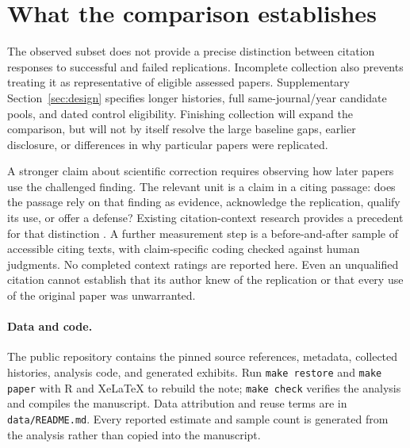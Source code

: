 \documentclass[11pt,letterpaper]{article}
\begin{document}
\section{What the comparison establishes}
The observed subset does not provide a precise distinction between citation responses to successful and failed replications. Incomplete collection also prevents treating it as representative of eligible assessed papers. Supplementary Section~\ref{sec:design} specifies longer histories, full same-journal/year candidate pools, and dated control eligibility. Finishing collection will expand the comparison, but will not by itself resolve the large baseline gaps, earlier disclosure, or differences in why particular papers were replicated.

A stronger claim about scientific correction requires observing how later papers use the challenged finding. The relevant unit is a claim in a citing passage: does the passage rely on that finding as evidence, acknowledge the replication, qualify its use, or offer a defense? Existing citation-context research provides a precedent for that distinction \citep{hardwicke2021}. A further measurement step is a before-and-after sample of accessible citing texts, with claim-specific coding checked against human judgments. No completed context ratings are reported here. Even an unqualified citation cannot establish that its author knew of the replication or that every use of the original paper was unwarranted.

\paragraph{Data and code.} The public repository contains the pinned source references, metadata, collected histories, analysis code, and generated exhibits. Run \texttt{make restore} and \texttt{make paper} with R and XeLaTeX to rebuild the note; \texttt{make check} verifies the analysis and compiles the manuscript. Data attribution and reuse terms are in \texttt{data/README.md}. Every reported estimate and sample count is generated from the analysis rather than copied into the manuscript.

\clearpage
\begingroup
\small


\endgroup

\clearpage
\appendix
\end{document}
